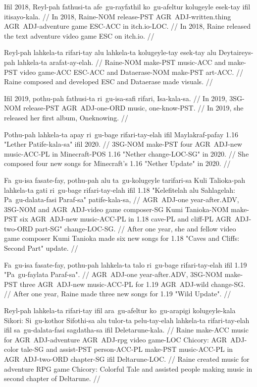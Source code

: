 \ex
\begingl
\gla Ifil 2018, Reyl-pah fathusi-ta  afe~gu-rayfathil ko~gu-afeltur kolugeyle esek-tay ifil itisayo-kala. //
\glb In 2018, Raine-NOM release-PST  AGR~ADJ-written.thing AGR~ADJ-adventure game ESC-ACC in itch.io-LOC. //
\glft In 2018, Raine released the text adventure video game ESC on itch.io. //
\endgl
\xe

\ex
\begingl
\gla Reyl-pah lahkela-ta rifari-tay alu lahkela-ta kolugeyle-tay esek-tay alu Deytaireys-pah lahkela-ta arafat-ay-elah. //
\glb Raine-NOM make-PST music-ACC and make-PST video game-ACC ESC-ACC and Dataerase-NOM make-PST art-ACC. //
\glft Raine composed and developed ESC and Dataerase made visuals. //
\endgl
\xe

\ex
\begingl
\gla Ifil 2019, pothu-pah fathusi-ta  ri~gu-isa-safi rifari, Isa-kala-sa. //
\glb In 2019, 3SG-NOM release-PST  AGR~ADJ-one-ORD music, one-know-PST. //
\glft In 2019, she released her first album, Oneknowing. //
\endgl
\xe

\ex
\begingl
\gla Pothu-pah lahkela-ta apay ri~gu-bage rifari-tay-elah ifil Maylakraf-pafay 1.16 "Lether Patife-kala-sa" ifil 2020. //
\glb 3SG-NOM make-PST four AGR~ADJ-new music-ACC-PL in Minecraft-POS 1.16 "Nether change-LOC-SG" in 2020. //
\glft She composed four new songs for Minecraft's 1.16 "Nether Update" in 2020. //
\endgl
\xe

\ex
\begingl
\gla Fa~gu-isa fasate-fay, pothu-pah alu  ta~gu-kolugeyle tarifari-sa Kuli Talioka-pah lahkela-ta gati ri~gu-bage rifari-tay-elah ifil 1.18 "Kelefitelah alu Sahlagelah: Pa~gu-dalata-fasi Paraf-sa" patife-kala-sa, //
\glb AGR~ADJ-one year-after.ADV, 3SG-NOM and  AGR~ADJ-video game composer-SG Kumi Tanioka-NOM make-PST six AGR~ADJ-new music-ACC-PL in 1.18 cave-PL and cliff-PL AGR~ADJ-two-ORD part-SG" change-LOC-SG. //
\glft After one year, she and fellow video game composer Kumi Tanioka  made six new songs for 1.18 "Caves and Cliffs: Second Part" update. //
\endgl
\xe

\ex
\begingl
\gla Fa~gu-isa fasate-fay, pothu-pah lahkela-ta talo ri~gu-bage rifari-tay-elah ifil 1.19 "Pa~gu-faylata Paraf-sa". //
\glb AGR~ADJ-one year-after.ADV, 3SG-NOM make-PST three AGR~ADJ-new music-ACC-PL for 1.19 AGR~ADJ-wild change-SG. //
\glft After one year, Raine made three new songs for 1.19 "Wild Update". //
\endgl
\xe

\ex
\begingl
\gla Reyl-pah lahkela-ta rifari-tay ifil ara~gu-afeltur ko~gu-arapigi kolugeyle-kala Sikori: Si~gu-kothor Sifothi-sa alu tulor-ta pelu-tay-elah lahkela-ta rifari-tay-elah ifil sa~gu-dalata-fasi sagdatha-sa ifil Deletarune-kala. //
\glb Raine make-ACC music for AGR~ADJ-adventure AGR~ADJ-rpg video game-LOC Chicory: AGR~ADJ-color tale-SG and assist-PST person-ACC-PL make-PST music-ACC-PL in AGR~ADJ-two-ORD chapter-SG ifil Deltarune-LOC. //
\glft Raine created music for adventure RPG game Chicory: Colorful Tale and assisted people making music in second chapter of Deltarune. //
\endgl
\xe

